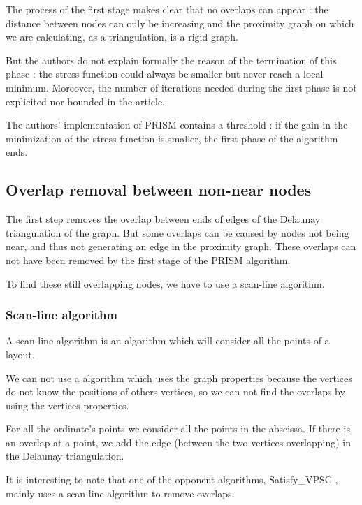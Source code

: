 \documentclass[12pt]{report}
\begin{document}
\bigskip
The process of the first stage makes clear that no overlaps can appear : the distance between nodes can only be increasing and the proximity graph on which we are calculating, as a triangulation, is a rigid graph.

But the authors do not explain formally the reason of the termination of this phase : the stress function could always be smaller but never reach a local minimum. Moreover, the number of iterations needed during the first phase is not explicited nor bounded in the article.

The authors' implementation of PRISM contains a threshold : if the gain in the minimization of the stress function is smaller, the first phase of the algorithm ends.


\subsection{Overlap removal between non-near nodes}

The first step removes the overlap between ends of edges of the Delaunay triangulation of the graph. But some overlaps can be caused by nodes not being near, and thus not generating an edge in the proximity graph. These overlaps can not have been removed by the first stage of the PRISM algorithm.

To find these still overlapping nodes, we have to use a scan-line algorithm.

\subsubsection{Scan-line algorithm}

A scan-line algorithm is an algorithm which will consider all the points of a layout.

We can not use a algorithm which uses the graph properties because the vertices do not know the positions of others vertices, so we can not find the overlaps by using the vertices properties.

For all the ordinate's points we consider all the points in the abscissa. If there is an overlap at a point, we add the edge (between the two vertices overlapping) in the Delaunay triangulation. 


\bigskip
It is interesting to note that one of the opponent algorithms, Satisfy\_VPSC \cite{VPSC06}, mainly uses a scan-line algorithm to remove overlaps.
\end{document}
